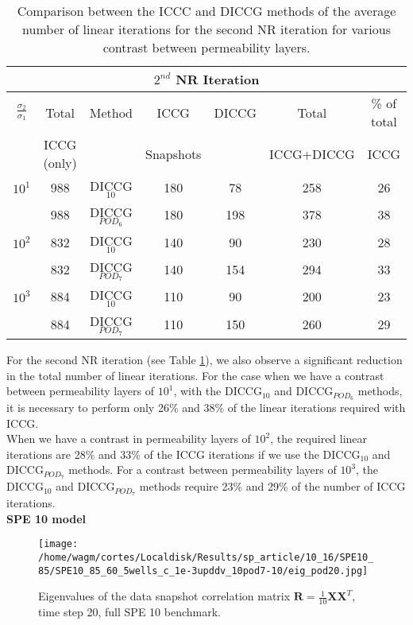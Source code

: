 \documentclass[12pt]{article}
\numberwithin{equation}{section}
\begin{document}
\begin{table}[!h]
\begin{minipage}{1\textwidth}
\vspace{-10pt}
\centering
\begin{tabular}{ ||c|c||c|c|c|c|c||} 

\hline
\multicolumn{7}{|c|}{$2^{nd}$ NR Iteration}  \\
\hline
$\frac{\sigma_2}{\sigma_1}$&Total&Method  & ICCG&DICCG &Total&\% of total\\
                           & ICCG (only)     &  & Snapshots& &ICCG+DICCG& ICCG\\
\hline
$10^{1}$ &988& DICCG$_{10}$&180&78&  258& 26\\
&988&DICCG$_{POD_6}$ &180&198&  378& 38\\
\hline
$10^{2}$&832&DICCG$_{10}$ &140&90&  230&28\\
&832&DICCG$_{POD_7}$&140&154&  294&33\\
\hline
$10^{3}$&884&DICCG$_{10}$&110&90&  200&23 \\
&884&DICCG$_{POD_7}$ &110&150&  260& 29\\
 \hline
 \end{tabular}
\caption{Comparison between the ICCC and DICCG methods of the average number of linear iterations for the second NR iteration for various contrast between permeability layers. }\label{table:litertot2}
\end{minipage}
\end{table}
For the second NR iteration (see Table \ref{table:litertot2}), we also observe a significant reduction in the total number of linear iterations.
For the case when we have a contrast between permeability layers of $10^{1}$, with the DICCG$_{10}$ and DICCG$_{POD_6}$ methods, it is necessary to perform only 26\% and 38\% of the linear iterations required with ICCG.\\
When we have a contrast in permeability layers of $10^{2}$, the required linear iterations are 28\% and 33\% of the ICCG iterations if we use the DICCG$_{10}$ and DICCG$_{POD_7}$ methods.
For a contrast between permeability layers of $10^{3}$, the DICCG$_{10}$ and DICCG$_{POD_7}$ methods require 23\%
and 29\% of the number of ICCG iterations. \\


\newpage
\textbf{SPE 10 model}\\
\begin{wrapfigure}{R}{6cm}
\centering 
\vspace{-10pt}
\texttt{[image: /home/wagm/cortes/Localdisk/Results/sp\_article/10\_16/SPE10\_85/SPE10\_85\_60\_5wells\_c\_1e-3upddv\_10pod7-10/eig\_pod20.jpg]}
\caption{Eigenvalues of the data snapshot correlation matrix $\mathbf{R}=\frac{1}{10}\mathbf{X}\mathbf{X}^T$, time step 20, full SPE 10 benchmark.}
\label{fig:eig_POD_SPE85}
\vspace{-5pt}
\end{wrapfigure}
\end{document}
